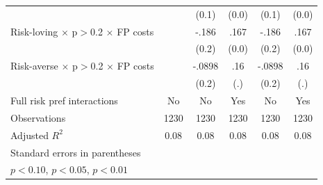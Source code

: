 \begin{table}[htbp]
\begin{tabular}{l*{5}{c}}
                &                  &    (0.1)         &    (0.0)         &    (0.1)         &    (0.0)         \\
Risk-loving $\times$ p$>$0.2 $\times$ FP costs&                  &    -.186         &     .167\sym{***}&    -.186         &     .167\sym{***}\\
                &                  &    (0.2)         &    (0.0)         &    (0.2)         &    (0.0)         \\
Risk-averse $\times$ p$>$0.2 $\times$ FP costs&                  &   -.0898         &      .16         &   -.0898         &      .16         \\
                &                  &    (0.2)         &      (.)         &    (0.2)         &      (.)         \\
Full risk pref interactions&       No         &       No         &      Yes         &       No         &      Yes         \\
\hline
Observations    &     1230         &     1230         &     1230         &     1230         &     1230         \\
Adjusted \(R^{2}\)&     0.08         &     0.08         &     0.08         &     0.08         &     0.08         \\
\hline\hline
\multicolumn{6}{l}{\footnotesize Standard errors in parentheses}\\
\multicolumn{6}{l}{\footnotesize \sym{*} \(p<0.10\), \sym{**} \(p<0.05\), \sym{***} \(p<0.01\)}\\
\end{tabular}
\end{table}
